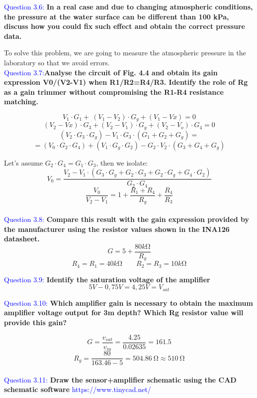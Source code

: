 \documentclass[12pt, a4papre]{article}
\begin{document}
	
	\textcolor{blue}{Question 3.6:} \textbf{ In a real case and due to changing atmospheric conditions, the pressure at the water surface can be different than 100 kPa, discuss how you could fix such effect and obtain the correct pressure data.} 
	
	To solve this problem, we are going to measure the atmospheric pressure in the laboratory so that we avoid errors.\\
	
	\textcolor{blue}{Question 3.7:}\textbf{Analyse the circuit of Fig. 4.4 and obtain its gain expression V0/(V2-V1) when R1/R2=R4/R3.  Identify the role of Rg as a gain trimmer without compromising the R1-R4 resistance matching.}
	
	\[V_{1} \cdotp G_{1} +\ ( V_{1} -V_{2}) \cdotp G_{g} +( V_{1} -Vx) =0\]
	\[( V_{2} -Vx) \cdotp G_{3} +( V_{2} -V_{1}) \cdotp G_{g} +( V_{2} -V_{o}) \cdotp G_{4} =0\]
	\[( V_{2} \cdotp G_{3} \cdotp G_{g}) -V_{1} \cdotp G_{3} \cdotp ( G_{1} +G_{2} +G_{g}) =\]
	\[=( V_{0} \cdotp G_{2} \cdotp G_{4}) +( V_{1} \cdotp G_{g} \cdotp G_{2}) -G_{2} \cdotp V_{2} \cdotp ( G_{3} +G_{4} +G_{g})\]
	
	Let's assume $G_{2} \cdotp G_{4} =G_{1} \cdotp G_{3}$, then we isolate:
	\[V_{0}  = \frac{V_{2} -V_{1} \cdotp ( G_{3} \cdotp G_{g} +G_{2} \cdotp G_{3} +G_{2} \cdotp G_{g} +G_{4} \cdotp G_{2})}{G_{2} \cdotp G_{4}}\]
	\[\frac{V_{0}}{V_{2} -V_{1}} =1+\frac{R_{1} +R_{4}}{R_{g}} +\frac{R_{4}}{R_{3}}\]
	\\
	
	\textcolor{blue}{Question 3.8:} \textbf{Compare this result with the gain expression provided by the manufacturer using the resistor values shown in the INA126 datasheet.}\\
	\[
		G=5+\frac{80k\si{\ohm}}{R_{g}}
	\]
	\[
		R_{4} =R_{1} =40k\si{\ohm}\qquad
		R_{2} =R_{3} =10k\si{\ohm}
	\]

	\textcolor{blue}{Question 3.9:}\textbf{ Identify the saturation voltage of the amplifier}
	\[
		5 V - 0,75 V = 4,25 V = V_{sat}
	\]

	\textcolor{blue}{Question 3.10:} \textbf{Which amplifier gain is necessary to obtain the maximum amplifier voltage output for 3m depth? Which Rg resistor value will provide this gain?}
	
	\[
		G = \frac{v_{sat}}{v_{in}} = \frac{4.25}{0.02635} =161.5
	\]
	\[
		R_g = \frac{80}{163.46-5} = \SI{504.86}{\ohm} \approx \SI{510}{\ohm}
	\]
	\\
	\textcolor{blue}{Question 3.11:} \textbf{Draw the sensor+amplifier schematic using the CAD schematic software} \textcolor{blue}{https://www.tinycad.net/}
	
\end{document}
